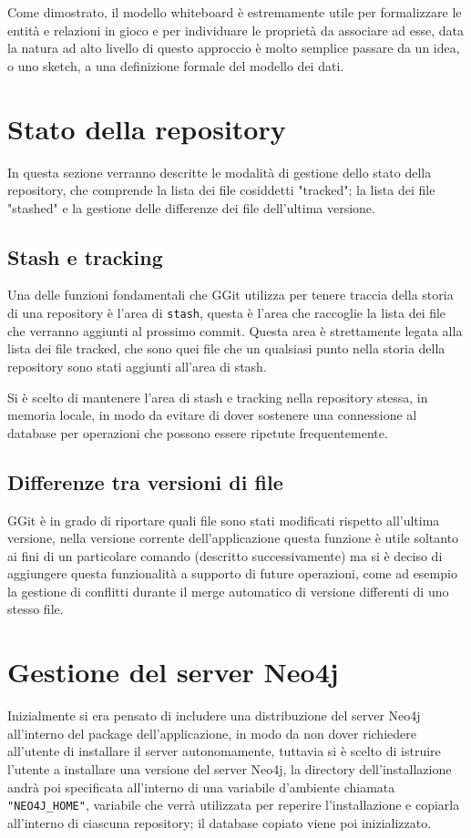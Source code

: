 Come dimostrato, il modello whiteboard è estremamente utile per formalizzare le entità e relazioni in gioco e per individuare le proprietà da associare ad esse, data la natura ad alto livello di questo approccio è molto semplice passare da un idea, o uno sketch, a una definizione formale del modello dei dati.
\section{Stato della repository}
\label{sec:stato}
In questa sezione verranno descritte le modalità di gestione dello stato della repository, che comprende la lista dei file cosiddetti "tracked"; la lista dei file "stashed" e la gestione delle differenze dei file dell'ultima versione.

\subsection{Stash e tracking}
\label{subsec:stash}
Una delle funzioni fondamentali che GGit utilizza per tenere traccia della storia di una repository è l'area di \texttt{stash}, questa è l'area che raccoglie la lista dei file che verranno aggiunti al prossimo commit.
Questa area è strettamente legata alla lista dei file tracked, che sono quei file che un qualsiasi punto nella storia della repository sono stati aggiunti all'area di stash.

Si è scelto di mantenere l'area di stash e tracking nella repository stessa, in memoria locale, in modo da evitare di dover sostenere una connessione al database per operazioni che possono essere ripetute frequentemente.

\subsection{Differenze tra versioni di file}
\label{subsec:differenze}
GGit è in grado di riportare quali file sono stati modificati rispetto all'ultima versione, nella versione corrente dell'applicazione questa funzione è utile soltanto ai fini di un particolare comando (descritto successivamente) ma si è deciso di aggiungere questa funzionalità a supporto di future operazioni, come ad esempio la gestione di conflitti durante il merge automatico di versione differenti di uno stesso file.

\section{Gestione del server Neo4j}
Inizialmente si era pensato di includere una distribuzione del server Neo4j all'interno del package dell'applicazione, in modo da non dover richiedere all'utente di installare il server autonomamente, tuttavia si è scelto di istruire l'utente a installare una versione del server Neo4j, la directory dell'installazione andrà poi specificata all'interno di una variabile d'ambiente chiamata \texttt{"NEO4J\_HOME"}, variabile che verrà utilizzata per reperire l'installazione e copiarla all'interno di ciascuna repository; il database copiato viene poi inizializzato.

